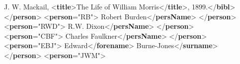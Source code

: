 \begin{shaded}
\hspace*{1em}J. W. Mackail, {<\textbf{title}>}The Life of William Morris{</\textbf{title}>}, 1899.{</\textbf{bibl}>}\mbox{}\newline 
{}\mbox{}\newline 
{</\textbf{person}>}\mbox{}\newline 
{<\textbf{person}\hspace*{1em}{xml:id}="{RB}">}\mbox{}\newline 
{}Robert Burden{</\textbf{persName}>}\mbox{}\newline 
{</\textbf{person}>}\mbox{}\newline 
{<\textbf{person}\hspace*{1em}{xml:id}="{RWD}">}\mbox{}\newline 
{}R.W. Dixon{</\textbf{persName}>}\mbox{}\newline 
{</\textbf{person}>}\mbox{}\newline 
{<\textbf{person}\hspace*{1em}{xml:id}="{CBF}">}\mbox{}\newline 
{}Charles Faulkner{</\textbf{persName}>}\mbox{}\newline 
{</\textbf{person}>}\mbox{}\newline 
{<\textbf{person}\hspace*{1em}{xml:id}="{EBJ}">}\mbox{}\newline 
{}\mbox{}\newline 
\hspace*{1em}Edward{</\textbf{forename}>}\mbox{}\newline 
\hspace*{1em}Burne-Jones{</\textbf{surname}>}\mbox{}\newline 
{}\mbox{}\newline 
{</\textbf{person}>}\mbox{}\newline 
{<\textbf{person}\hspace*{1em}{xml:id}="{JWM}">}\mbox{}\newline 

\end{shaded}
